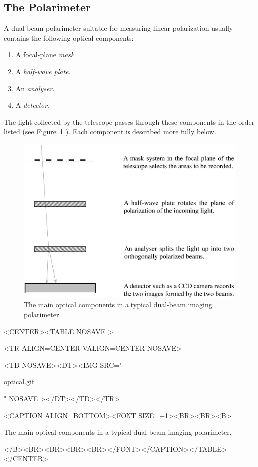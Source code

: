 \documentclass[twoside,11pt]{article}
\newenvironment{latexonly}{}{}
\newcommand{\latex}[1]{#1}
\newcommand{\html}[1]{}
\renewcommand{\_}{\texttt{\symbol{95}}}
\newcommand{\htmlfig}[3]{
   \label{#1}
   \begin{rawhtml} <CENTER><TABLE NOSAVE > \end{rawhtml}
   \begin{rawhtml} <TR ALIGN=CENTER VALIGN=CENTER NOSAVE> \end{rawhtml}
   \begin{rawhtml} <TD NOSAVE><DT><IMG SRC=" \end{rawhtml}
   #2
   \begin{rawhtml} " NOSAVE ></DT></TD></TR> \end{rawhtml}
   \begin{rawhtml} <CAPTION ALIGN=BOTTOM><FONT SIZE=+1><BR><BR><B> \end{rawhtml}
   #3 
   \begin{rawhtml} </B><BR><BR><BR><BR></FONT></CAPTION></TABLE></CENTER> \end{rawhtml}
}
\begin{document}
\subsection{The Polarimeter}
A dual-beam polarimeter suitable for measuring linear polarization usually 
contains the following optical components:

\begin{enumerate}
\item A focal-plane \emph{mask}.
\item A \emph{half-wave plate}.
\item An \emph{analyser}.
\item A \emph{detector}.
\end{enumerate}

The light collected by the telescope passes through these components in
the order listed (see \latex{Figure~\ref{fig:optical}} \html{the next figure}
). Each component is described more fully below.

\begin{latexonly}
  \vspace{2mm}
  \begin{figure}[htb]
  \begin{center}
  \includegraphics[clip,scale=0.5]{sun223_figures/optical.eps}
  \caption{The main optical components in a typical dual-beam imaging polarimeter.}
  \label{fig:optical}
  \end{center}
  \end{figure}
\end{latexonly}

\begin{htmlonly}
\htmlfig{fig:optical}{optical.gif}{The main optical components in a
typical dual-beam imaging polarimeter.}
\end{htmlonly}
\end{document}

